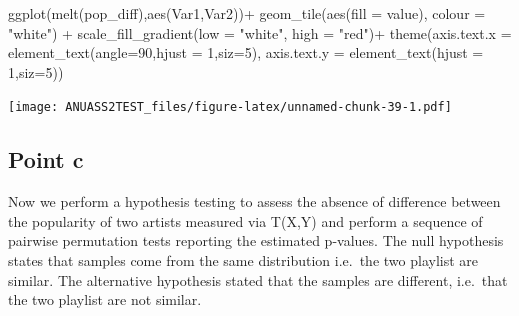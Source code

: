 \documentclass[
]{article}
\newenvironment{Shaded}{\begin{snugshade}}{\end{snugshade}}
\newcommand{\AttributeTok}[1]{\textcolor[rgb]{0.77,0.63,0.00}{#1}}
\newcommand{\DecValTok}[1]{\textcolor[rgb]{0.00,0.00,0.81}{#1}}
\newcommand{\FunctionTok}[1]{\textcolor[rgb]{0.00,0.00,0.00}{#1}}
\newcommand{\NormalTok}[1]{#1}
\newcommand{\SpecialCharTok}[1]{\textcolor[rgb]{0.00,0.00,0.00}{#1}}
\newcommand{\StringTok}[1]{\textcolor[rgb]{0.31,0.60,0.02}{#1}}
\begin{document}
\begin{Shaded}
\begin{Highlighting}[]
\FunctionTok{ggplot}\NormalTok{(}\FunctionTok{melt}\NormalTok{(pop\_diff),}\FunctionTok{aes}\NormalTok{(Var1,Var2))}\SpecialCharTok{+}
  \FunctionTok{geom\_tile}\NormalTok{(}\FunctionTok{aes}\NormalTok{(}\AttributeTok{fill =}\NormalTok{ value), }\AttributeTok{colour =} \StringTok{"white"}\NormalTok{)  }\SpecialCharTok{+}
  \FunctionTok{scale\_fill\_gradient}\NormalTok{(}\AttributeTok{low =} \StringTok{"white"}\NormalTok{, }\AttributeTok{high =} \StringTok{"red"}\NormalTok{)}\SpecialCharTok{+}
  \FunctionTok{theme}\NormalTok{(}\AttributeTok{axis.text.x =} \FunctionTok{element\_text}\NormalTok{(}\AttributeTok{angle=}\DecValTok{90}\NormalTok{,}\AttributeTok{hjust =} \DecValTok{1}\NormalTok{,}\AttributeTok{siz=}\DecValTok{5}\NormalTok{),}
        \AttributeTok{axis.text.y =} \FunctionTok{element\_text}\NormalTok{(}\AttributeTok{hjust =} \DecValTok{1}\NormalTok{,}\AttributeTok{siz=}\DecValTok{5}\NormalTok{))}
\end{Highlighting}
\end{Shaded}

\texttt{[image: ANUASS2TEST\_files/figure-latex/unnamed-chunk-39-1.pdf]}

\hypertarget{point-c-1}{%
\subsection{Point c}\label{point-c-1}}

Now we perform a hypothesis testing to assess the absence of difference
between the popularity of two artists measured via T(X,Y) and perform a
sequence of pairwise permutation tests reporting the estimated p-values.
The null hypothesis states that samples come from the same distribution
i.e.~the two playlist are similar. The alternative hypothesis stated
that the samples are different, i.e.~that the two playlist are not
similar.
\end{document}
